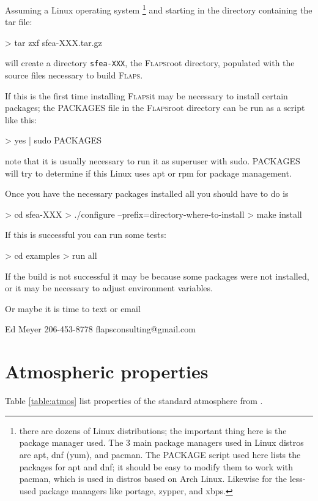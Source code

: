 \documentclass[10pt,openany,twoside]{book}
\numberwithin{equation}{section}   %
\newcommand{\Code}[1]{{\small\tt #1}}
\newcommand{\Flaps}{{\normalfont\scshape Flaps\:}}
\newcommand{\Tableref}[1]{Table \ref{#1}}
\begin{document}
Assuming a Linux operating system
\footnote{there are dozens of Linux distributions; the important thing here is
the package manager used. The 3 main package managers used in Linux
distros are apt, dnf (yum), and pacman. The PACKAGE script used here
lists the packages for apt and dnf; it should be easy to modify them
to work with pacman, which is used in distros based on Arch Linux.
Likewise for the less-used package managers like portage, zypper, and xbps.}
and starting in the directory containing the tar file:
\begin{example}
>  tar zxf sfea-XXX.tar.gz
\end{example}
will create a directory \Code{sfea-XXX}, the \Flaps root directory,
populated with the source files necessary to build \Flaps.

If this is the first time installing \Flaps it may be necessary to
install certain packages; the PACKAGES file in the \Flaps root directory
can be run as a script like this:
\begin{example}
> yes | sudo PACKAGES
\end{example}
note that it is usually necessary to run it as superuser with sudo.
PACKAGES will try to determine if this Linux uses apt or rpm for
package management.

Once you have the necessary packages installed all you should have
to do is
\begin{example}
>  cd sfea-XXX
>  ./configure --prefix=directory-where-to-install
>  make install
\end{example}

If this is successful you can run some tests:
\begin{example}
>  cd examples
>  run all
\end{example}

If the build is not successful it may be because some packages
were not installed, or it may be necessary to adjust environment
variables.

Or maybe it is time to text or email
\begin{example}
Ed Meyer
206-453-8778
flapsconsulting@gmail.com
\end{example}

\newpage
\section{Atmospheric properties}\label{sect:atmos}
\Tableref{table:atmos} list properties of the standard atmosphere
from \cite{united1976us}.
\end{document}

